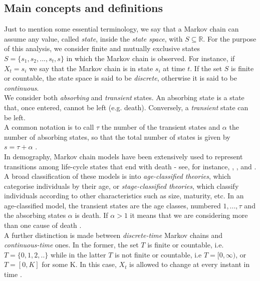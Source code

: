 \documentclass[\main/main.tex]{subfiles}
\begin{document}
\subsection{Main concepts and definitions}

Just to mention some essential terminology, we say that a Markov chain can assume any value, called \textit{state}, inside the \textit{state space}, with $S \subseteq \mathds{R}$. For the purpose of this analysis, we consider finite and mutually exclusive states $S = \{s_1,s_2,...,s_t, s\}$ in which the Markov chain is observed. For instance, if $X_t = s_i$ we say that the Markov chain is in state $s_i$ at time $t$.
If the set $S$ is finite or countable, the state space is said to be \textit{discrete}, otherwise it is said to be \textit{continuous}.\\
We consider both \textit{absorbing} and \textit{transient} states. An absorbing state is a state that, once entered, cannot be left (e.g. death). Conversely, a \textit{transient} state can be left.\\ A common notation is to call $\tau$ the number of the transient states and $\alpha$ the number of absorbing states, so that the total number of states is given by $s = \tau + \alpha$ \citep{VanDaalen2017}.\\


In demography, Markov chain models have been extensively used to represent transitions among life-cycle states that end with death - see, for instance, \cite{Caswell2001, Caswell2006, Caswell2009}, \cite{Fujiwara2002}, and \cite{Cochran1992}. A broad classification of these models is into \textit{age-classified theories}, which categorise individuals by their age, or \textit{stage-classified
theories}, which classify individuals according to other characteristics such as size, maturity, etc. In an age-classified model, the transient states are the age classes, numbered $1,..., \tau$ and the absorbing states $\alpha$ is death. If $\alpha >1$ it means that we are considering more than one cause of death \citep{Caswell2018}. \\

A further distinction is made between \textit{discrete-time} Markov chains and \textit{continuous-time} ones. In the former, the set $T$ is finite or countable, i.e. $T = \{ 0,1,2,..\}$ while in the latter $T$ is not finite or countable, i.e $T = [0,\infty)$, or $T = [0,K]$ for some K. In this case, $X_t$ is allowed to change at every instant in time \citep{Holmes2015}.
\end{document}
